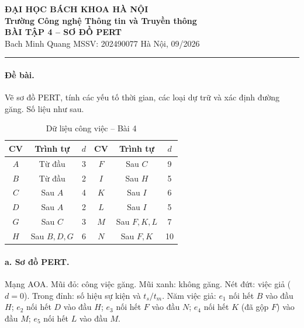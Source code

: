 \documentclass[12pt,a4paper]{article}
\begin{document}
\begin{center}
  {\large\bfseries ĐẠI HỌC BÁCH KHOA HÀ NỘI}\\[0.4pt]
  {\bfseries Trường Công nghệ Thông tin và Truyền thông}\\[3.5pt]
  {\Large\bfseries BÀI TẬP 4 -- SƠ ĐỒ PERT}\\[0.5pt]
  {\small Bach Minh Quang \quad MSSV: 202490077 \quad Hà Nội, 09/2026}
\end{center}
\vspace{-2pt}
\hrule
\vspace{5pt}

\paragraph{Đề bài.}
Vẽ sơ đồ PERT, tính các yếu tố thời gian, các loại dự trữ và xác định đường găng.
Số liệu như sau.

\begin{table}[H]\centering
\caption{Dữ liệu công việc -- Bài 4}
\small
\begin{tabular}{cccccc}
\toprule
\textbf{CV} & \textbf{Trình tự} & \textbf{$d$} &
\textbf{CV} & \textbf{Trình tự} & \textbf{$d$}\\
\midrule
$A$ & Từ đầu & 3 & $F$ & Sau $C$ & 9\\
$B$ & Từ đầu & 2 & $I$ & Sau $H$ & 5\\
$C$ & Sau $A$ & 4 & $K$ & Sau $I$ & 6\\
$D$ & Sau $A$ & 2 & $L$ & Sau $I$ & 5\\
$G$ & Sau $C$ & 3 & $M$ & Sau $F,K,L$ & 7\\
$H$ & Sau $B,D,G$ & 6 & $N$ & Sau $F,K$ & 10\\
\bottomrule
\end{tabular}
\end{table}

\paragraph{a. Sơ đồ PERT.}
Mạng AOA. Mũi đỏ: công việc găng. Mũi xanh: không găng. Nét đứt: việc giả ($d=0$).
Trong đỉnh: số hiệu sự kiện và $t_s/t_m$.
Năm việc giả: $e_1$ nối hết $B$ vào đầu $H$; $e_2$ nối hết $D$ vào đầu $H$;
$e_3$ nối hết $F$ vào đầu $N$; $e_4$ nối hết $K$ (đã gộp $F$) vào đầu $M$;
$e_5$ nối hết $L$ vào đầu $M$.
\end{document}
